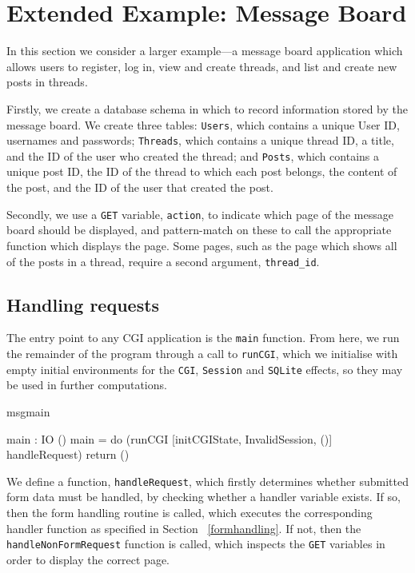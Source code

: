 \section{Extended Example: Message Board}
\label{messageboard}
In this section we consider a larger example---a message board application
which allows users to register, log in, view and create threads, and list and
create new posts in threads. 

Firstly, we create a database schema in which to record information stored by
the message board. We create three tables: \texttt{Users}, which contains a
unique User ID, usernames and passwords; \texttt{Threads}, which contains a
unique thread ID, a title, and the ID of the user who created the thread; and
\texttt{Posts}, which contains a unique post ID, the ID of the thread to which
each post belongs, the content of the post, and the ID of the user that created
the post.

Secondly, we use a \texttt{GET} variable, \texttt{action}, to indicate which page of the
message board should be displayed, and pattern-match on these to call the
appropriate function which displays the page. Some pages, such as the page
which shows all of the posts in a thread, require a second argument,
\texttt{thread\_id}.  

\subsection{Handling requests}
The entry point to any CGI application is the \texttt{main} function. From
here, we run the remainder of the program through a call to \texttt{runCGI},
which we initialise with empty initial environments for the \texttt{CGI}, 
\texttt{Session} and
\texttt{SQLite} effects, so they may be used in further computations. 

\begin{SaveVerbatim}{msgmain}

main : IO ()
main = do (runCGI [initCGIState, 
                  InvalidSession, ()] 
           handleRequest)
          return ()

\end{SaveVerbatim}

\noindent
We define a function, \texttt{handleRequest}, which firstly determines
whether submitted form data must be handled, by checking whether a handler
variable exists.
If so, then the form handling routine is called, which executes the
corresponding handler function as specified in Section ~\ref{formhandling}. If
not, then the \texttt{handleNonFormRequest} function is called, which inspects
the \texttt{GET} variables in order to display the correct page.

